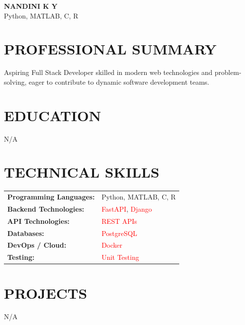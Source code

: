\documentclass[9.5pt,a4paper]{extarticle}
\begin{document}
\begin{center}
{\Large \textbf{NANDINI K Y}} \\ \vspace{2pt}
Python, MATLAB, C, R
\end{center}

\section*{PROFESSIONAL SUMMARY}
Aspiring Full Stack Developer skilled in modern web technologies and problem-solving, eager to contribute to dynamic software development teams.

\section*{EDUCATION}
N/A


\section*{TECHNICAL SKILLS}
\begin{tabular}{@{}p{2.3in}p{4.6in}@{}}
\textbf{Programming Languages:} & Python, MATLAB, C, R \\
\textbf{Backend Technologies:} & \textcolor{red}{FastAPI}, \textcolor{red}{Django} \\
\textbf{API Technologies:} & \textcolor{red}{REST APIs} \\
\textbf{Databases:} & \textcolor{red}{PostgreSQL} \\
\textbf{DevOps / Cloud:} & \textcolor{red}{Docker} \\
\textbf{Testing:} & \textcolor{red}{Unit Testing} \\
\end{tabular}



\section*{PROJECTS}
N/A


\end{document}
